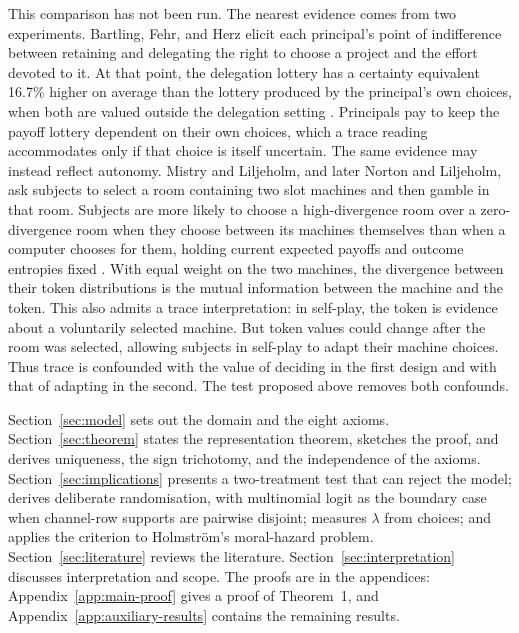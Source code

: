 \documentclass[11pt,a4paper]{article}
\theoremstyle{definition}
\newcommand{\1}{\mathbf 1}
\begin{document}
This comparison has not been run.  The nearest evidence comes from two experiments.  Bartling, Fehr, and Herz elicit each principal's point of indifference between retaining and delegating the right to choose a project and the effort devoted to it.  At that point, the delegation lottery has a certainty equivalent 16.7\% higher on average than the lottery produced by the principal's own choices, when both are valued outside the delegation setting \cite{BartlingFehrHerz2014}.  Principals pay to keep the payoff lottery dependent on their own choices, which a trace reading accommodates only if that choice is itself uncertain. The same evidence may instead reflect autonomy.  Mistry and Liljeholm, and later Norton and Liljeholm, ask subjects to select a room containing two slot machines and then gamble in that room.  Subjects are more likely to choose a high-divergence room over a zero-divergence room when they choose between its machines themselves than when a computer chooses for them, holding current expected payoffs and outcome entropies fixed \cite{MistryLiljeholm2016,NortonLiljeholm2020}.  With equal weight on the two machines, the divergence between their token distributions is the mutual information between the machine and the token.  This also admits a trace interpretation: in self-play, the token is evidence about a voluntarily selected machine.  But token values could change after the room was selected, allowing subjects in self-play to adapt their machine choices.  Thus trace is confounded with the value of deciding in the first design and with that of adapting in the second.  The test proposed above removes both confounds.

Section~\ref{sec:model} sets out the domain and the eight axioms.  Section~\ref{sec:theorem} states the representation theorem,
sketches the proof, and derives uniqueness, the sign trichotomy, and the
independence of the axioms.
Section~\ref{sec:implications} presents a two-treatment test that can reject the model; derives deliberate randomisation, with multinomial logit as the boundary case when channel-row supports are pairwise disjoint; measures $\lambda$ from choices; and applies the criterion to Holmstr\"om's moral-hazard problem.
Section~\ref{sec:literature} reviews the literature.
Section~\ref{sec:interpretation} discusses interpretation and scope.  The proofs are in the appendices:
Appendix~\ref{app:main-proof} gives a proof of Theorem~1, and Appendix~\ref{app:auxiliary-results} contains the remaining results.


\end{document}
